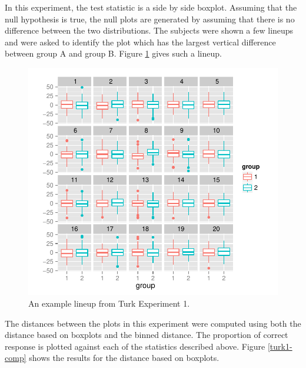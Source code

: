 \documentclass[12]{article}
\begin{document}
In this experiment, the test statistic is a side by side boxplot. Assuming that the null hypothesis is true, the null plots are generated by assuming that there is no difference between the two distributions. The subjects were shown a few lineups and were asked to identify the plot which has the largest vertical difference between group A and group B. Figure \ref{turk1} gives such a lineup. \\

\begin{figure}[htbp]
\centering
\includegraphics[width=.5\textwidth]{turk1-example.pdf}
\caption{An example lineup from Turk Experiment 1.}
\label{turk1}
\end{figure}

The distances between the plots in this experiment were computed using both the distance based on boxplots and the binned distance. The proportion of correct response is plotted against each of the statistics described above. Figure \ref{turk1-comp} shows the results for the distance based on boxplots.
\end{document}
